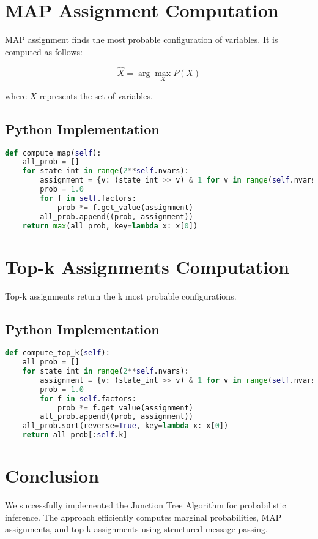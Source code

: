 \section{MAP Assignment Computation}

MAP assignment finds the most probable configuration of variables. It is computed as follows:

\begin{equation}
    \hat{X} = \arg\max_X P(X)
\end{equation}

where \( X \) represents the set of variables.

\subsection{Python Implementation}

\begin{lstlisting}[language=Python]
def compute_map(self):
    all_prob = []
    for state_int in range(2**self.nvars):
        assignment = {v: (state_int >> v) & 1 for v in range(self.nvars)}
        prob = 1.0
        for f in self.factors:
            prob *= f.get_value(assignment)
        all_prob.append((prob, assignment))
    return max(all_prob, key=lambda x: x[0])
\end{lstlisting}

\section{Top-k Assignments Computation}

Top-k assignments return the k most probable configurations.

\subsection{Python Implementation}

\begin{lstlisting}[language=Python]
def compute_top_k(self):
    all_prob = []
    for state_int in range(2**self.nvars):
        assignment = {v: (state_int >> v) & 1 for v in range(self.nvars)}
        prob = 1.0
        for f in self.factors:
            prob *= f.get_value(assignment)
        all_prob.append((prob, assignment))
    all_prob.sort(reverse=True, key=lambda x: x[0])
    return all_prob[:self.k]
\end{lstlisting}


\section{Conclusion}
We successfully implemented the Junction Tree Algorithm for probabilistic inference. The approach efficiently computes marginal probabilities, MAP assignments, and top-k assignments using structured message passing.


